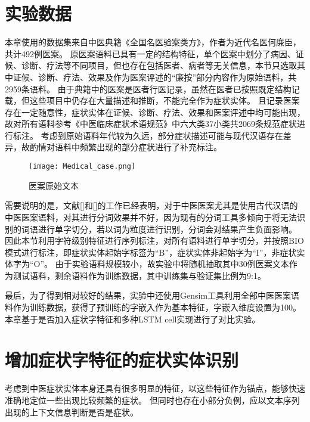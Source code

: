 \section{实验数据}
本章使用的数据集来自中医典籍《全国名医验案类方》，作者为近代名医何廉臣，共计492例医案。
原医案语料已具有一定的结构特征，单个医案中划分了病因、证候、诊断、疗法等不同项目，但也存在包括医者、病者等无关信息，本节只选取其中证候、诊断、疗法、效果及作为医案评述的“廉按”部分内容作为原始语料，共2959条语料。
由于典籍中的医案是医者行医记录，虽然在医者已按照既定结构记载，但这些项目中仍存在大量描述和推断，不能完全作为症状实体。
且记录医案存在一定随意性，症状实体在证候、诊断、疗法、效果和医案评述中均可能出现，故对所有语料参考《中医临床症状术语规范》中六大类37小类共2069条规范症状进行标注。
考虑到原始语料年代较为久远，部分症状描述可能与现代汉语存在差异，故酌情对语料中频繁出现的部分症状进行了补充标注。

\begin{figure}[H]
    \centering
    \texttt{[image: Medical\_case.png]}
    \caption{医案原始文本}
    \label{fig:medical_case}
\end{figure}

需要说明的是，文献[]和[]的工作已经表明，对于中医医案尤其是使用古代汉语的中医医案语料，对其进行分词效果并不好，因为现有的分词工具多倾向于将无法识别的词语进行单字切分，若以词为粒度进行识别，分词会对结果产生负面影响。
因此本节利用字符级别特征进行序列标注，对所有语料进行单字切分，并按照BIO模式进行标注，即症状实体起始字标签为“B”，症状实体非起始字为“I”，非症状实体字为“O”。
由于实验语料规模较小，故实验中将随机抽取其中30例医案文本作为测试语料，剩余语料作为训练数据，其中训练集与验证集比例为9:1。

最后，为了得到相对较好的结果，实验中还使用Gensim工具利用全部中医医案语料作为训练数据，获得了预训练的字嵌入作为基本特征，字嵌入维度设置为100。
本章基于是否加入症状字特征和多种LSTM cell实现进行了对比实验。

\section{增加症状字特征的症状实体识别}
考虑到中医症状实体本身还具有很多明显的特征，以这些特征作为锚点，能够快速准确地定位一些出现比较频繁的症状。
但同时也存在小部分负例，应以文本序列出现的上下文信息判断是否是症状。

